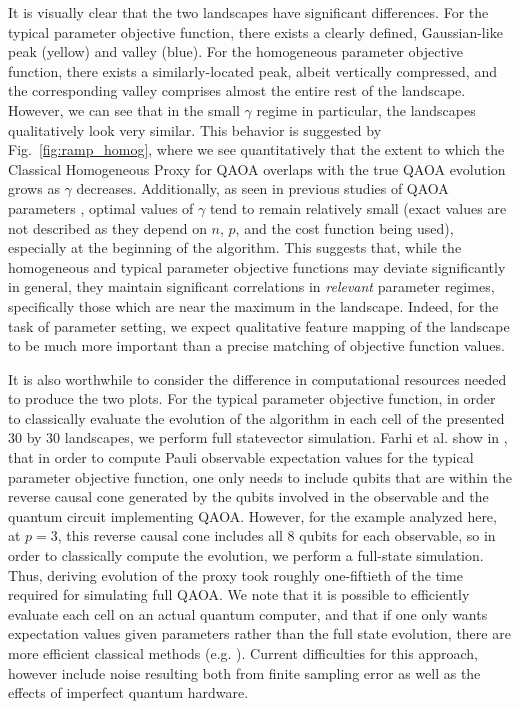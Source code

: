 \documentclass[superscriptaddress,pra,aps,10pt,longbibliography,notitlepage]{revtex4-1}
\begin{document}
It is visually clear that the two landscapes have significant differences. For the typical parameter objective function, there exists a clearly defined, Gaussian-like peak (yellow) and valley (blue). For the homogeneous parameter objective function, there exists a similarly-located peak, albeit vertically compressed, and the corresponding valley comprises almost the entire rest of the landscape. However, we can see that in the small $\gamma$ regime in particular, the landscapes qualitatively look very similar. This behavior is suggested by Fig.~\ref{fig:ramp_homog}, where we see quantitatively that the extent to which the Classical Homogeneous Proxy for QAOA overlaps with the true QAOA evolution grows as $\gamma$ decreases. 
Additionally, as seen in previous studies of QAOA parameters \cite{zhou20, crooks18, shaydulin21_qaoakit, lotshaw21}, optimal values of $\gamma$ tend to remain relatively small (exact values are not described as they depend on $n$, $p$, and the cost function being used), especially at the beginning of the algorithm. This suggests that, while the homogeneous and typical parameter objective functions may deviate significantly in general, they maintain significant correlations in \emph{relevant} parameter regimes, specifically those which are near the maximum in the landscape. Indeed, for the task of parameter setting, we expect qualitative feature mapping of the landscape to be much more important than a precise matching of objective function values.

It is also worthwhile to consider the difference in computational resources needed to produce the two plots. For the typical parameter objective function, in order to classically evaluate the evolution of the algorithm
in each cell of the presented 30 by 30 landscapes, we perform full statevector simulation. Farhi et al. show in \cite{farhi14}, that in order to compute Pauli observable expectation values for the typical parameter objective function, one only needs to include qubits that are within the reverse causal cone generated by the qubits involved in the observable and the quantum circuit implementing QAOA. However, for the example analyzed here, at $p=3$, this reverse causal cone includes all $8$ qubits for each observable, so in order to classically compute the evolution, we perform a full-state simulation. Thus, deriving evolution of the proxy took roughly one-fiftieth of the time required for simulating full QAOA. We note that it is possible to efficiently evaluate each cell on an actual quantum computer, and that if one only wants expectation values given parameters rather than the full state evolution, there are more efficient classical methods (e.g. \cite{farhi14,wang18}). Current difficulties for this approach, however include noise resulting both from finite sampling error as well as the effects of imperfect quantum hardware.
\end{document}
